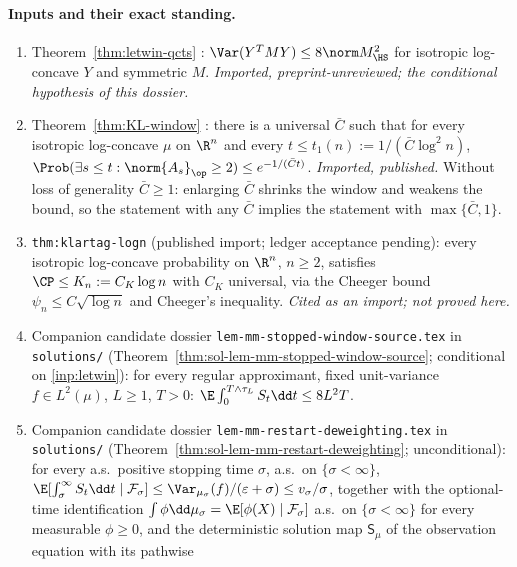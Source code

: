 \documentclass[../main.tex]{subfiles}
\begin{document}
\paragraph{Inputs and their exact standing.}
\begin{enumerate}[label=(I\arabic*),leftmargin=2.8em]
  \item\label{inp:letwin} Theorem~\ref{thm:letwin-qcts}
  \cite[Thm.~1.2]{Letwin2026QuadraticKLS}: $\Var(Y^TMY)\le8\norm M_{\HS}^2$ for
  isotropic log-concave $Y$ and symmetric $M$.  \emph{Imported, preprint-unreviewed;
  the conditional hypothesis of this dossier.}
  \item\label{inp:window} Theorem~\ref{thm:KL-window} \cite[Thm.~61]{KLnotes}: there is
  a universal $\bar C$ such that for every isotropic log-concave $\mu$ on $\R^n$ and
  every $t\le t_1(n):=1/(\bar C\log^2n)$,
  $\Prob(\exists s\le t:\norm{A_s}_\op\ge2)\le e^{-1/(\bar Ct)}$.  \emph{Imported,
  published.}  Without loss of generality $\bar C\ge1$: enlarging $\bar C$ shrinks the
  window and weakens the bound, so the statement with any $\bar C$ implies the
  statement with $\max\{\bar C,1\}$.
  \item\label{inp:klartag} \texttt{thm:klartag-logn} \cite{Klartag2023Logarithmic}
  (published import; ledger acceptance pending): every isotropic log-concave
  probability on $\R^n$, $n\ge2$, satisfies $\CP\le K_n:=C_K\log n$ with $C_K$
  universal, via the Cheeger bound $\psi_n\le C\sqrt{\log n}$ and Cheeger's
  inequality.  \emph{Cited as an import; not proved here.}
  \item\label{inp:stopped} Companion candidate dossier
  \texttt{lem-mm-stopped-window-source.tex} in \texttt{solutions/}
  (Theorem~\ref{thm:sol-lem-mm-stopped-window-source}; conditional on
  \ref{inp:letwin}): for every regular approximant, fixed unit-variance
  $f\in L^2(\mu)$, $L\ge1$, $T>0$:
  $\E\int_0^{T\wedge\tau_L}S_t\dd t\le8L^2T$.
  \item\label{inp:restart} Companion candidate dossier
  \texttt{lem-mm-restart-deweighting.tex} in \texttt{solutions/}
  (Theorem~\ref{thm:sol-lem-mm-restart-deweighting}; unconditional): for every a.s.\
  positive stopping time $\sigma$, a.s.\ on $\{\sigma<\infty\}$,
  $\E[\int_\sigma^\infty S_t\dd t\mid\mathcal F_\sigma]
  \le\Var_{\mu_\sigma}(f)/(\varepsilon+\sigma)\le v_\sigma/\sigma$, together with the
  optional-time identification $\int\phi\dd\mu_\sigma=\E[\phi(X)\mid\mathcal F_\sigma]$
  a.s.\ on $\{\sigma<\infty\}$ for every measurable $\phi\ge0$, and the deterministic
  solution map $\mathsf S_\mu$ of the observation equation with its pathwise

\end{enumerate}
\end{document}
